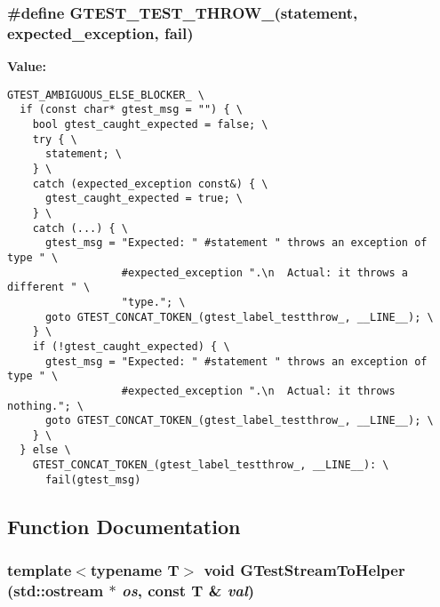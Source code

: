 \subsubsection{\setlength{\rightskip}{0pt plus 5cm}\#define GTEST\_\-TEST\_\-THROW\_\-(statement, expected\_\-exception, fail)}\label{gtest-internal_8h_0a353cb81f7d68f65063db098b73a8cf}


\textbf{Value:}

\begin{Code}\begin{verbatim}GTEST_AMBIGUOUS_ELSE_BLOCKER_ \
  if (const char* gtest_msg = "") { \
    bool gtest_caught_expected = false; \
    try { \
      statement; \
    } \
    catch (expected_exception const&) { \
      gtest_caught_expected = true; \
    } \
    catch (...) { \
      gtest_msg = "Expected: " #statement " throws an exception of type " \
                  #expected_exception ".\n  Actual: it throws a different " \
                  "type."; \
      goto GTEST_CONCAT_TOKEN_(gtest_label_testthrow_, __LINE__); \
    } \
    if (!gtest_caught_expected) { \
      gtest_msg = "Expected: " #statement " throws an exception of type " \
                  #expected_exception ".\n  Actual: it throws nothing."; \
      goto GTEST_CONCAT_TOKEN_(gtest_label_testthrow_, __LINE__); \
    } \
  } else \
    GTEST_CONCAT_TOKEN_(gtest_label_testthrow_, __LINE__): \
      fail(gtest_msg)
\end{verbatim}
\end{Code}


\subsection{Function Documentation}
\subsubsection{\setlength{\rightskip}{0pt plus 5cm}template$<$typename T$>$ void GTestStreamToHelper (std::ostream $\ast$ {\em os}, const T \& {\em val})\hspace{0.3cm}{\tt  [inline]}}\label{gtest-internal_8h_e4bfe31edc2850cacf0d087ee1681e22}



